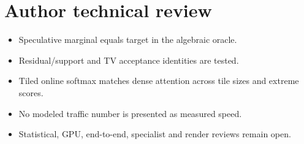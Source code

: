 \chapter*{Author technical review}\begin{itemize}\item Speculative marginal equals target in the algebraic oracle.\item Residual/support and TV acceptance identities are tested.\item Tiled online softmax matches dense attention across tile sizes and extreme scores.\item No modeled traffic number is presented as measured speed.\item Statistical, GPU, end-to-end, specialist and render reviews remain open.\end{itemize}